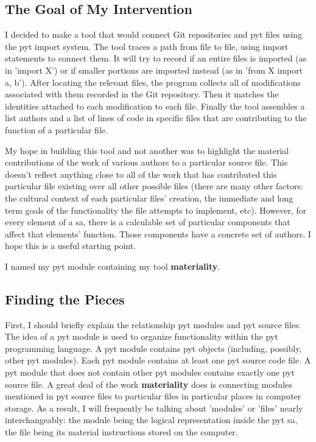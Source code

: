 \documentclass[a4paper,man,natbib,floatsintext]{apa6}
\begin{document}
  \subsection{The Goal of My Intervention}
  I decided to make a tool that would connect Git repositories and \Gls{pyt} files using the \Gls{pyt} import system. The tool traces a path from file to file, using import statements to connect them. It will try to record if an entire files is imported (as in 'import X') or if smaller portions are imported instead (as in 'from X import a, b'). After locating the relevant files, the program collects all of modifications associated with them recorded in the Git repository. Then it matches the identities attached to each modification to each file. Finally the tool assembles a list authors and a list of lines of code in specific files that are contributing to the function of a particular file.

  My hope in building this tool and not another was to highlight the material contributions of the work of various authors to a particular source file. This doesn't reflect anything close to all of the work that has contributed this particular file existing over all other possible files (there are many other factors: the cultural context of each particular files' creation, the immediate and long term goals of the functionality the file attempts to implement, etc). However, for every element of a \gls{sa}, there is a calculable set of particular components that affect that elements' function. Those components have a concrete set of authors. I hope this is a useful starting point.
  \\
  \begin{flushleft}
  I named my \Gls{pyt} module containing my tool \textbf{materiality}.
  \end{flushleft}

  \subsection{Finding the Pieces}
  First, I should briefly explain the relationship \Gls{pyt} modules and \Gls{pyt} source files. The idea of a \Gls{pyt} module is used to organize functionality within the \Gls{pyt} programming language. A \Gls{pyt} module contains \Gls{pyt} objects (including, possibly, other \Gls{pyt} modules). Each \Gls{pyt} module contains at least one \Gls{pyt} source code file. A \Gls{pyt} module that does not contain other \Gls{pyt} modules contains exactly one \Gls{pyt} source file. A great deal of the work \textbf{materiality} does is connecting modules mentioned in \Gls{pyt} source files to particular files in particular places in computer storage. As a result, I will frequently be talking about 'modules' or 'files' nearly interchangeably: the module being the logical representation inside the \Gls{pyt} \gls{sa}, the file being its material instructions stored on the computer.
\end{document}
